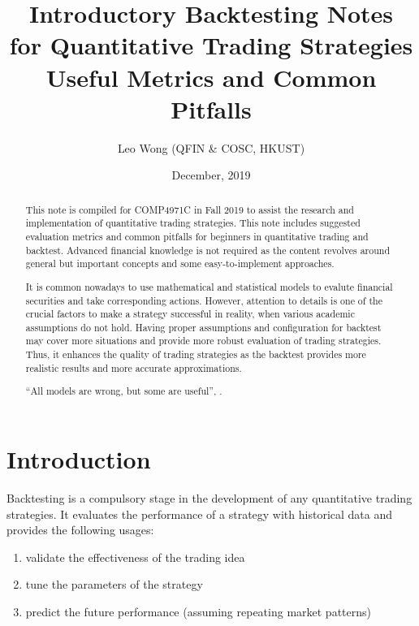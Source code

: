 \documentclass[12pt]{article}
\title{Introductory Backtesting Notes \\ for Quantitative Trading Strategies \\[2ex]
  \large Useful Metrics and Common Pitfalls}
\author{Leo Wong (QFIN \& COSC, HKUST)}
\date{December, 2019}
\begin{document}
\begin{titlingpage}
  \maketitle
  \begin{abstract}
    This note is compiled for COMP4971C in Fall 2019 to assist the research and implementation of quantitative trading strategies. This note includes suggested evaluation metrics and common pitfalls for beginners in quantitative trading and backtest. Advanced financial knowledge is not required as the content revolves around general but important concepts and some easy-to-implement approaches.

    It is common nowadays to use mathematical and statistical models to evalute financial securities and take corresponding actions. However, attention to details is one of the crucial factors to make a strategy successful in reality, when various academic assumptions do not hold. Having proper assumptions and configuration for backtest may cover more situations and provide more robust evaluation of trading strategies. Thus, it enhances the quality of trading strategies as the backtest provides more realistic results and more accurate approximations.

    \enquote{All models are wrong, but some are useful}, \cite{allmodelsarewrong}.
  \end{abstract}
\end{titlingpage}


\tableofcontents

\section{Introduction}

Backtesting is a compulsory stage in the development of any quantitative trading strategies. It evaluates the performance of a strategy with historical data and provides the following usages:

\begin{enumerate}
  \item validate the effectiveness of the trading idea
  \item tune the parameters of the strategy
  \item predict the future performance (assuming repeating market patterns)
\end{enumerate}
\end{document}
